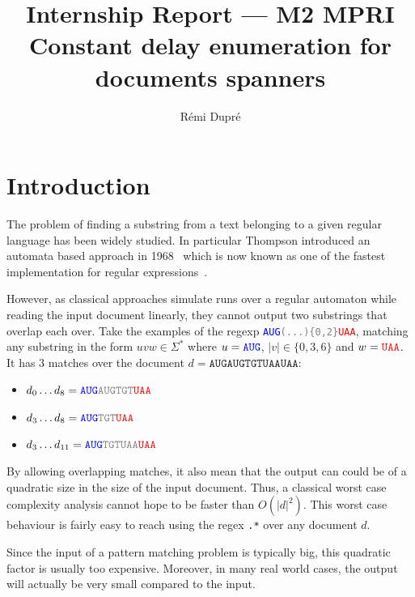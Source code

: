 \documentclass[12px]{article}
\title{%
  Internship Report --- M2 MPRI \\
  Constant delay enumeration for documents spanners
}
\author{Rémi Dupré}
\theoremstyle{definition}
\begin{document}
  \maketitle

  
  \pagebreak

  \section{Introduction}

    The problem of finding a substring from a text belonging to a given
    regular language has been widely studied. In particular Thompson
    introduced an automata based approach in
    1968~\cite{thompson1968programming} which is now known as one of the
    fastest implementation for regular expressions~\cite{cox2007regular}.

    However, as classical approaches simulate runs over a regular automaton
    while reading the input document linearly, they cannot output two
    substrings that overlap each over. Take the examples of the regexp
    \texttt{\textcolor{blue}{AUG}\textcolor{gray}{(...)\{0,2\}}\textcolor{red}{UAA}},
    matching any substring in the form $uvw \in \Sigma^*$ where $u =
    \texttt{\textcolor{blue}{AUG}}$, $|v| \in \{0, 3, 6\}$ and $w =
    \texttt{\textcolor{red}{UAA}}$. It has 3 matches over the document $d =
    \texttt{AUGAUGTGTUAAUAA}$:
      \begin{itemize}
        \item $d_0 \ldots d_8 =
          \texttt{\textcolor{blue}{AUG}\textcolor{gray}{AUGTGT}\textcolor{red}{UAA}}$
        \item $d_3 \ldots d_8 =
          \texttt{\textcolor{blue}{AUG}\textcolor{gray}{TGT}\textcolor{red}{UAA}}$
        \item $d_3 \ldots d_{11} =
          \texttt{\textcolor{blue}{AUG}\textcolor{gray}{TGTUAA}\textcolor{red}{UAA}}$
      \end{itemize}

    By allowing overlapping matches, it also mean that the output can could be
    of a quadratic size in the size of the input document. Thus, a classical
    worst case complexity analysis cannot hope to be faster than $O(|d|^2)$.
    This worst case behaviour is fairly easy to reach using the regex
    \texttt{.*} over any document $d$.

    Since the input of a pattern matching problem is typically big, this
    quadratic factor is usually too expensive. Moreover, in many real world
    cases, the output will actually be very small compared to the input.
\end{document}
